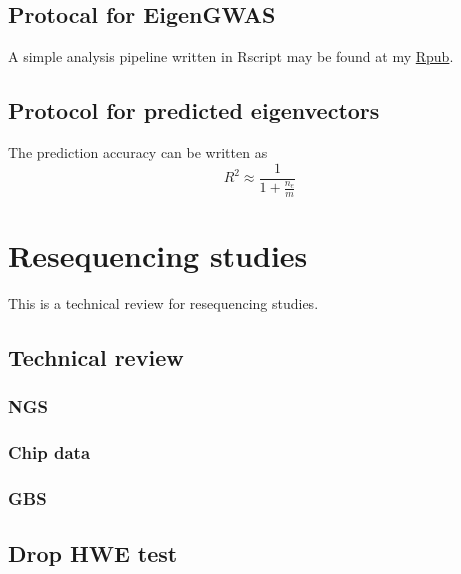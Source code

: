 \documentclass[]{book}
\begin{document}
\hypertarget{protocal-for-eigengwas}{%
\section{Protocal for EigenGWAS}\label{protocal-for-eigengwas}}

A simple analysis pipeline written in Rscript may be found at my
\href{http://rpubs.com/gc5k/EigenGWASpipeline}{Rpub}.

\hypertarget{protocol-for-predicted-eigenvectors}{%
\section{Protocol for predicted
eigenvectors}\label{protocol-for-predicted-eigenvectors}}

The prediction accuracy can be written as
\[R^2 \approx \frac{1}{1+\frac{n_e}{m}}\]

\hypertarget{resequencing-studies}{%
\chapter{Resequencing studies}\label{resequencing-studies}}

This is a technical review for resequencing studies.

\hypertarget{technical-review}{%
\section{Technical review}\label{technical-review}}

\hypertarget{ngs}{%
\subsection{NGS}\label{ngs}}

\hypertarget{chip-data}{%
\subsection{Chip data}\label{chip-data}}

\hypertarget{gbs}{%
\subsection{GBS}\label{gbs}}

\hypertarget{drop-hwe-test}{%
\section{Drop HWE test}\label{drop-hwe-test}}
\end{document}
